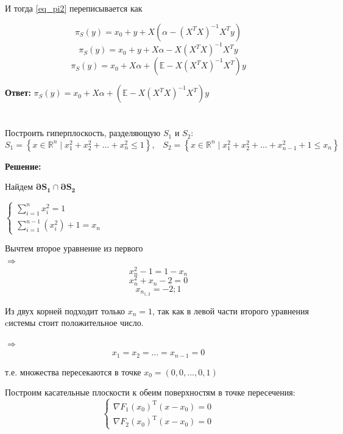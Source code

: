 \documentclass[a4paper,12pt]{article}
\newcommand{\lt}{\left}
\newcommand{\rt}{\right}
\newcommand{\al}{\alpha}
\begin{document}
И тогда \ref{eq_pi2} переписывается как

$$\pi_{S}(y) = x_0 + y + X\lt(\al - (X^TX)^{-1}X^Ty\rt)$$
$$\pi_{S}(y) = x_0 + y + X\al - X(X^TX)^{-1}X^Ty$$
$$\pi_{S}(y) = x_0 + X\al + (\mathbb{E} - X(X^TX)^{-1}X^T)y$$

\textbf{Ответ:} $\pi_{S}(y) = x_0 + X\al + (\mathbb{E} - X(X^TX)^{-1}X^T)y$


\section{}

Построить гиперплоскость, разделяющую $S_1$ и $S_2$:
$$S_1 = \left\{ x \in \mathbb{R}^n \mid x_1^2 + x_2^2 + \ldots + x_n^2 \le 1\right\}, \;\;\; S_2 = \left\{ x \in \mathbb{R}^n \mid x_1^2 + x_2^2 + \ldots + x_{n-1}^2 + 1 \le x_n \right\}$$

\vspace{\baselineskip}

\textbf{Решение:}

\vspace{\baselineskip}

Найдем $\mathbf{\partial S_1 \cap \partial S_2}$

$\begin{cases}
\sum\limits_{i=1}^n x_i^2 = 1  \\
\sum\limits_{i=1}^{n-1} (x_i^2) +1= x_n 
\end{cases}$

\vspace{\baselineskip}

Вычтем второе уравнение из первого\\
$\Longrightarrow$  $$x_n^2 -1 = 1 - x_n$$
$$x_n^2 + x_n -2 = 0$$
$$x_{n_{1,2}} = -2; 1$$

Из двух корней подходит только $x_n = 1$, так как в левой части второго уравнения cистемы стоит положительное число.

$\Rightarrow$
$$ x_1= x_2  = \ldots = x_{n-1} = 0 $$

т.е. множества пересекаются в точке $x_0 = (0, 0, \ldots, 0, 1)$

Построим касательные плоскости к обеим поверхностям в точке пересечения:\\




\begin{equation}\label{system_1}
\begin{cases}
\nabla F_1(x_0)	^ \mathrm{T}(x-x_0) = 0\\
\nabla F_2(x_0)	^ \mathrm{T}(x-x_0) = 0
\end{cases}
\end{equation}
\end{document}

